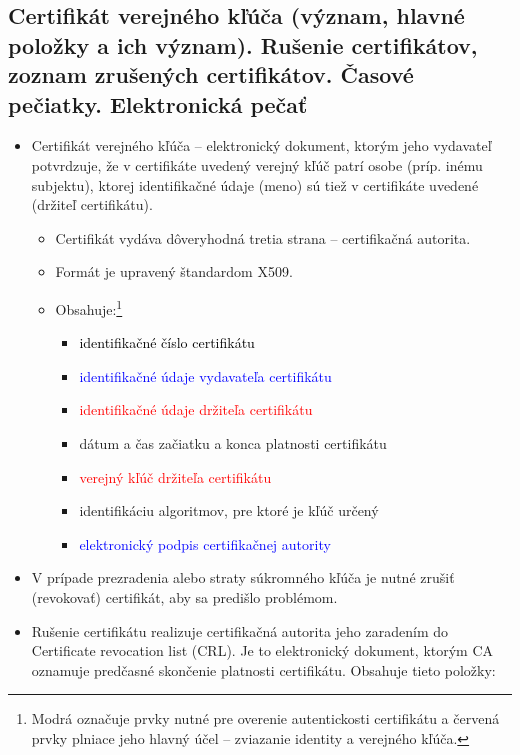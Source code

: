 \documentclass[12pt,a4paper]{article}
\begin{document}
{    \subsection{Certifikát verejného kľúča (význam, hlavné položky a ich význam). Rušenie certifikátov, zoznam zrušených certifikátov. Časové pečiatky. Elektronická pečať}
    \begin{itemize}
        \item Certifikát verejného kľúča -- elektronický dokument, ktorým jeho vydavateľ potvrdzuje, že v certifikáte uvedený verejný kľúč patrí osobe (príp. inému subjektu), ktorej identifikačné údaje (meno) sú tiež v certifikáte uvedené (držiteľ certifikátu).
        \begin{itemize}
            \item Certifikát vydáva dôveryhodná tretia strana -- certifikačná autorita.
            \item Formát je upravený štandardom X509.
            \item Obsahuje:\footnote{Modrá označuje prvky nutné pre overenie autentickosti certifikátu a červená prvky plniace jeho hlavný účel -- zviazanie identity a verejného kľúča.}
            \begin{itemize}
                \item \textcolor{black}{identifikačné číslo certifikátu}
                \item \textcolor{blue}{identifikačné údaje vydavateľa certifikátu}
                \item \textcolor{red}{identifikačné údaje držiteľa certifikátu}
                \item dátum a čas začiatku a konca platnosti certifikátu
                \item \textcolor{red}{verejný kľúč držiteľa certifikátu}
                \item identifikáciu algoritmov, pre ktoré je kľúč určený
                \item \textcolor{blue}{elektronický podpis certifikačnej autority}
            \end{itemize}
        \end{itemize}
        \item V prípade prezradenia alebo straty súkromného kľúča je nutné zrušiť (revokovať) certifikát, aby sa predišlo problémom.
        \item Rušenie certifikátu realizuje certifikačná autorita jeho zaradením do Certificate revocation list (CRL). Je to elektronický dokument, ktorým CA oznamuje predčasné skončenie platnosti certifikátu. Obsahuje tieto položky:

\end{itemize}}
\end{document}

